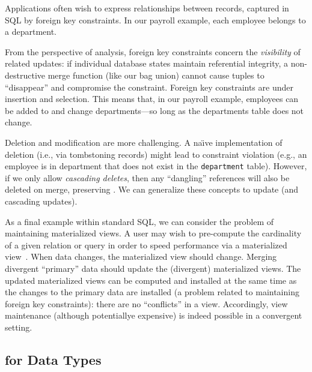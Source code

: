  Applications often wish to express
relationships between records, captured in SQL by foreign key
constraints. In our payroll example, each employee belongs to a
department.

From the perspective of \iconfluence analysis, foreign key constraints
concern the \textit{visibility} of related updates: if individual
database states maintain referential integrity, a non-destructive
merge function (like our bag union) cannot cause tuples to
``disappear'' and compromise the constraint. Foreign key constraints
are \iconfluent under insertion and selection. This means that, in our
payroll example, employees can be added to and change departments---so
long as the departments table does not change.

Deletion and modification are more challenging. A na\"{\i}ve
implementation of deletion (i.e., via tombstoning records) might lead
to constraint violation (e.g., an employee is in department that does
not exist in the \texttt{department} table). However, if we only allow
\textit{cascading deletes}, then any ``dangling'' references will also
be deleted on merge, preserving \iconfluence. We can generalize these
concepts to update (and cascading updates).

 As a final example within standard SQL,
we can consider the problem of maintaining materialized views. A user
may wish to pre-compute the cardinality of a given relation or query
in order to speed performance via a materialized
view~\cite{tamer-book}. When data changes, the materialized view should
change. Merging divergent ``primary'' data should update the
(divergent) materialized views. The updated materialized views can be
computed and installed at the same time as the changes to the primary
data are installed (a problem related to maintaining foreign key
constraints): there are no ``conflicts'' in a view. Accordingly, view
maintenance (although potentiallye expensive) is indeed possible in a
convergent setting.

\subsection{\iconfluence for Data Types}

